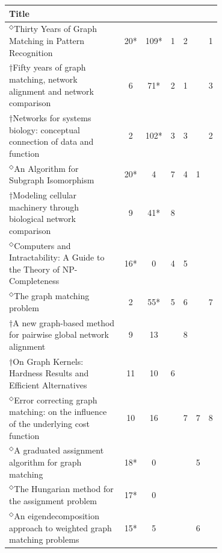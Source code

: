 \documentclass[12pt]{thesis}
\theoremstyle{plain}
\theoremstyle{definition}
\theoremstyle{remark}
\begin{document}
\begin{table}[H]
\centering
\vspace{-.5cm}
{\fontsize{10}{13}\selectfont
\begin{tabular}{|L{0.7\linewidth}|c|c|c|c|c|c|}
\hline
Title &  &   &  &   &   &  \\ 
\hline\hline
$^\Diamond$Thirty Years of Graph Matching in Pattern Recognition  \cite{Conte_2004} & 20* & 109* & 1 & 2 &  & 1 \\ \hline
$\dagger$Fifty years of graph matching, network alignment and network comparison  \cite{Emmert_Streib_2016} & 6 & 71* & 2 & 1 &  & 3 \\ \hline
$\dagger$Networks for systems biology: conceptual connection of data and function  \cite{Emmert_Streib_2011} & 2 & 102* & 3 & 3 &  & 2 \\ \hline
$^\Diamond$An Algorithm for Subgraph Isomorphism  \cite{Ullmann_1976} & 20* & 4 & 7 & 4 & 1 &  \\ \hline
$\dagger$Modeling cellular machinery through biological network comparison  \cite{Sharan_2006} & 9 & 41* & 8 &  &  &  \\ \hline
$^\Diamond$Computers and Intractability: A Guide to the Theory of NP-Completeness  \cite{Hartmanis_1982} & 16* & 0 & 4 & 5 &  &  \\ \hline
$^\Diamond$The graph matching problem  \cite{Livi_2012} & 2 & 55* & 5 & 6 &  & 7 \\ \hline
$\dagger$A new graph-based method for pairwise global network alignment  \cite{Klau_2009} & 9 & 13 &  & 8 &  &  \\ \hline
$\dagger$On Graph Kernels: Hardness Results and Efficient Alternatives  \cite{Gartner_2003} & 11 & 10 & 6 &  &  &  \\ \hline
$^\Diamond$Error correcting graph matching: on the influence of the underlying cost function  \cite{Bunke_1999} & 10 & 16 &  & 7 & 7 & 8 \\ \hline
$^\Diamond$A graduated assignment algorithm for graph matching  \cite{Gold_1996} & 18* & 0 &  &  & 5 &  \\ \hline
$^\Diamond$The Hungarian method for the assignment problem  \cite{Kuhn_1955} & 17* & 0 &  &  &  &  \\ \hline
$^\Diamond$An eigendecomposition approach to weighted graph matching problems  \cite{Umeyama_1988} & 15* & 5 &  &  & 6 &  \\ \hline

\end{tabular}}
\end{table}
\end{document}
